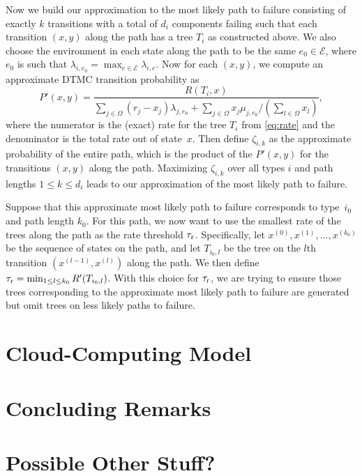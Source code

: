 \documentclass[12pt]{article}
\newcommand{\changed}[1]{#1}
\newcommand{\changed}[1]{\textcolor{red}{#1}}
\begin{document}
\changed{Now we build our approximation
to the most likely path to failure
consisting of exactly $k$ transitions with a
total of $d_{i}$ components failing such
that each transition $(x,y)$ along the path has a
tree $T_{i}$ as constructed above.
We also choose the environment in each
state along the path to be the
same $e_0 \in \mathcal{E}$,
where $e_0$ is such that
$\lambda_{i, e_0}
= \max_{e \in \mathcal{E}} \lambda_{i, e}$.
Now for each $(x,y)$, we compute an
approximate DTMC transition probability
as
$$
P'(x,y) = \frac{R(T_i,x)}
{\sum_{j \in \Omega} (r_j - x_j) \lambda_{j, e_0}
+ \sum_{j \in \Omega} x_j \mu_{j,e_0}/
(\sum_{l \in \Omega} x_l)},
$$
where the numerator is the
(exact) rate for the tree $T_i$
from \eqref{eq:rate}
and the denominator is the total rate
out of state~$x$.
Then define $\zeta_{i, k}$ as
the approximate probability of the entire
path, which is the product of the $P'(x,y)$
for the transitions $(x,y)$ along the path.
Maximizing $\zeta_{i,k}$ over all types $i$
and path lengths $1 \leq k \leq d_{i}$
leads to our approximation of
the most likely path to failure.
}


\changed{
Suppose that this approximate
most likely path to failure
corresponds to type~$i_0$
and path length $k_0$.
For this path,
we now want to use the smallest rate
of the trees along the path as the rate
threshold $\tau_{\textrm r}$.
Specifically, let $x^{(0)}, x^{(1)},
\ldots, x^{(k_0)}$ be the sequence
of states on the path,
and let $T_{i_0,l}$ be the
tree on the $l$th
transition $(x^{(l-1)}, x^{(l)})$
along the path.
We then define
$\tau_{\textrm r} = \min_{1 \leq l \leq k_0}
R'(T_{i_0,l})$.
With this choice for $\tau_{\textrm r}$,
we are trying
to ensure those trees
corresponding
to the approximate most likely path to failure
are generated but omit trees
on less likely paths to failure.
}







\section{Cloud-Computing Model}
\label{sec:cloud}



\section{Concluding Remarks}
\label{sec:conc}


\section{Possible Other Stuff?}
\end{document}

